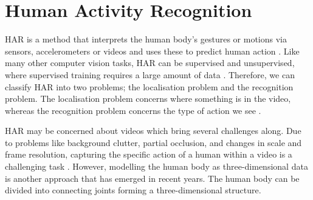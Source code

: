 \section{Human Activity Recognition}

\gls{HAR} is a method that interprets the human body's gestures or motions via sensors, accelerometers or videos and uses these to predict human action \autocite{jobanputra2019human}. Like many other computer vision tasks, \gls{HAR} can be supervised and unsupervised, where supervised training requires a large amount of data \autocite{ann2014human}. Therefore, we can classify \gls{HAR} into two problems; the localisation problem and the recognition problem. The localisation problem concerns where something is in the video, whereas the recognition problem concerns the type of action we see \autocite{vrigkas2015review}. 

\gls{HAR} may be concerned about videos which bring several challenges along. Due to problems like background clutter, partial occlusion, and changes in scale and frame resolution, capturing the specific action of a human within a video is a challenging task \autocite{vrigkas2015review}. However, modelling the human body as three-dimensional data is another approach that has emerged in recent years. The human body can be divided into connecting joints forming a three-dimensional structure.  